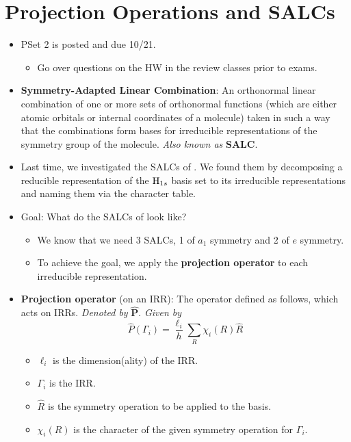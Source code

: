 \documentclass[../notes.tex]{subfiles}
\begin{document}
\section{Projection Operations and SALCs}
\begin{itemize}
    \item {}PSet 2 is posted and due 10/21.
    \begin{itemize}
        \item Go over questions on the HW in the review classes prior to exams.
    \end{itemize}
    \item \textbf{Symmetry-Adapted Linear Combination}: An orthonormal linear combination of one or more sets of orthonormal functions (which are either atomic orbitals or internal coordinates of a molecule) taken in such a way that the combinations form bases for irreducible representations of the symmetry group of the molecule. \emph{Also known as} \textbf{SALC}.
    \item Last time, we investigated the SALCs of . We found them by decomposing a reducible representation of the $\ce{H}_{1s}$ basis set to its irreducible representations and naming them via the character table.
    \item Goal: What do the SALCs of  look like?
    \begin{itemize}
        \item We know that we need 3 SALCs, 1 of $a_1$ symmetry and 2 of $e$ symmetry.
        \item To achieve the goal, we apply the \textbf{projection operator} to each irreducible representation.
    \end{itemize}
    \item \textbf{Projection operator} (on an IRR): The operator defined as follows, which acts on IRRs. \emph{Denoted by} $\bm{\hat{P}}$. \emph{Given by}
    \begin{equation*}
        \hat{P}(\Gamma_i) = \frac{\ell_i}{h}\sum_R\chi_i(R)\hat{R}
    \end{equation*}
    \begin{itemize}
        \item $\ell_i$ is the dimension(ality) of the IRR.
        \item $\Gamma_i$ is the IRR.
        \item $\hat{R}$ is the symmetry operation to be applied to the basis.
        \item $\chi_i(R)$ is the character of the given symmetry operation for $\Gamma_i$.

\end{itemize}
\end{itemize}
\end{document}

